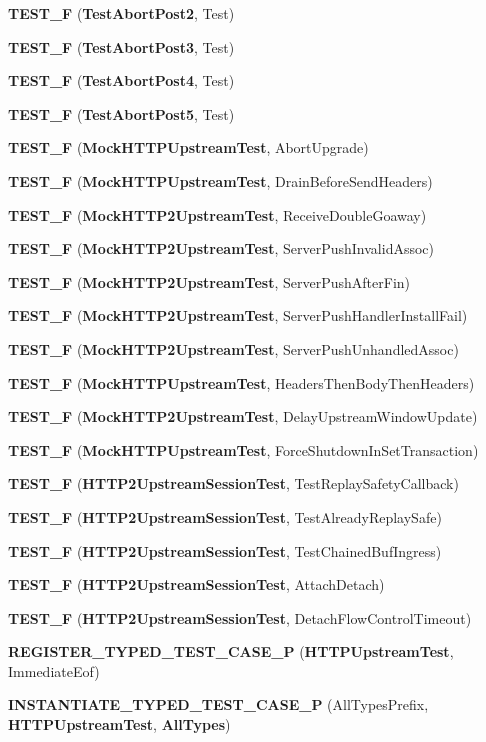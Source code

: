 \begin{DoxyCompactItemize}
{\bf T\+E\+S\+T\+\_\+F} ({\bf Test\+Abort\+Post2}, Test)
\item 
{\bf T\+E\+S\+T\+\_\+F} ({\bf Test\+Abort\+Post3}, Test)
\item 
{\bf T\+E\+S\+T\+\_\+F} ({\bf Test\+Abort\+Post4}, Test)
\item 
{\bf T\+E\+S\+T\+\_\+F} ({\bf Test\+Abort\+Post5}, Test)
\item 
{\bf T\+E\+S\+T\+\_\+F} ({\bf Mock\+H\+T\+T\+P\+Upstream\+Test}, Abort\+Upgrade)
\item 
{\bf T\+E\+S\+T\+\_\+F} ({\bf Mock\+H\+T\+T\+P\+Upstream\+Test}, Drain\+Before\+Send\+Headers)
\item 
{\bf T\+E\+S\+T\+\_\+F} ({\bf Mock\+H\+T\+T\+P2\+Upstream\+Test}, Receive\+Double\+Goaway)
\item 
{\bf T\+E\+S\+T\+\_\+F} ({\bf Mock\+H\+T\+T\+P2\+Upstream\+Test}, Server\+Push\+Invalid\+Assoc)
\item 
{\bf T\+E\+S\+T\+\_\+F} ({\bf Mock\+H\+T\+T\+P2\+Upstream\+Test}, Server\+Push\+After\+Fin)
\item 
{\bf T\+E\+S\+T\+\_\+F} ({\bf Mock\+H\+T\+T\+P2\+Upstream\+Test}, Server\+Push\+Handler\+Install\+Fail)
\item 
{\bf T\+E\+S\+T\+\_\+F} ({\bf Mock\+H\+T\+T\+P2\+Upstream\+Test}, Server\+Push\+Unhandled\+Assoc)
\item 
{\bf T\+E\+S\+T\+\_\+F} ({\bf Mock\+H\+T\+T\+P\+Upstream\+Test}, Headers\+Then\+Body\+Then\+Headers)
\item 
{\bf T\+E\+S\+T\+\_\+F} ({\bf Mock\+H\+T\+T\+P2\+Upstream\+Test}, Delay\+Upstream\+Window\+Update)
\item 
{\bf T\+E\+S\+T\+\_\+F} ({\bf Mock\+H\+T\+T\+P\+Upstream\+Test}, Force\+Shutdown\+In\+Set\+Transaction)
\item 
{\bf T\+E\+S\+T\+\_\+F} ({\bf H\+T\+T\+P2\+Upstream\+Session\+Test}, Test\+Replay\+Safety\+Callback)
\item 
{\bf T\+E\+S\+T\+\_\+F} ({\bf H\+T\+T\+P2\+Upstream\+Session\+Test}, Test\+Already\+Replay\+Safe)
\item 
{\bf T\+E\+S\+T\+\_\+F} ({\bf H\+T\+T\+P2\+Upstream\+Session\+Test}, Test\+Chained\+Buf\+Ingress)
\item 
{\bf T\+E\+S\+T\+\_\+F} ({\bf H\+T\+T\+P2\+Upstream\+Session\+Test}, Attach\+Detach)
\item 
{\bf T\+E\+S\+T\+\_\+F} ({\bf H\+T\+T\+P2\+Upstream\+Session\+Test}, Detach\+Flow\+Control\+Timeout)
\item 
{\bf R\+E\+G\+I\+S\+T\+E\+R\+\_\+\+T\+Y\+P\+E\+D\+\_\+\+T\+E\+S\+T\+\_\+\+C\+A\+S\+E\+\_\+P} ({\bf H\+T\+T\+P\+Upstream\+Test}, Immediate\+Eof)
\item 
{\bf I\+N\+S\+T\+A\+N\+T\+I\+A\+T\+E\+\_\+\+T\+Y\+P\+E\+D\+\_\+\+T\+E\+S\+T\+\_\+\+C\+A\+S\+E\+\_\+P} (All\+Types\+Prefix, {\bf H\+T\+T\+P\+Upstream\+Test}, {\bf All\+Types})
\end{DoxyCompactItemize}


